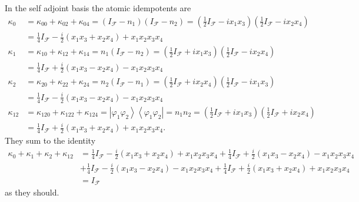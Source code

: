 \documentclass[aps,preprint]{revtex4}%
\begin{document}
In the self adjoint basis the atomic idempotents are%
\begin{align}
\kappa_{0}  & =\kappa_{00}+\kappa_{02}+\kappa_{04}=\left(  I_{\mathcal{F}%
}-n_{1}\right)  \left(  I_{\mathcal{F}}-n_{2}\right)  =\left(  \frac{1}%
{2}I_{\mathcal{F}}-ix_{1}x_{3}\right)  \left(  \frac{1}{2}I_{\mathcal{F}%
}-ix_{2}x_{4}\right)  \\
& =\frac{1}{4}I_{\mathcal{F}}-\frac{i}{2}\left(  x_{1}x_{3}+x_{2}x_{4}\right)
+x_{1}x_{2}x_{3}x_{4}\\
\kappa_{1}  & =\kappa_{10}+\kappa_{12}+\kappa_{14}=n_{1}\left(  I_{\mathcal{F}%
}-n_{2}\right)  =\left(  \frac{1}{2}I_{\mathcal{F}}+ix_{1}x_{3}\right)
\left(  \frac{1}{2}I_{\mathcal{F}}-ix_{2}x_{4}\right)  \\
& =\frac{1}{4}I_{\mathcal{F}}+\frac{i}{2}\left(  x_{1}x_{3}-x_{2}x_{4}\right)
-x_{1}x_{2}x_{3}x_{4}\\
\kappa_{2}  & =\kappa_{20}+\kappa_{22}+\kappa_{24}=n_{2}\left(  I_{\mathcal{F}%
}-n_{1}\right)  =\left(  \frac{1}{2}I_{\mathcal{F}}+ix_{2}x_{4}\right)
\left(  \frac{1}{2}I_{\mathcal{F}}-ix_{1}x_{3}\right)  \\
& =\frac{1}{4}I_{\mathcal{F}}-\frac{i}{2}\left(  x_{1}x_{3}-x_{2}x_{4}\right)
-x_{1}x_{2}x_{3}x_{4}\\
\kappa_{12}  & =\kappa_{120}+\kappa_{122}+\kappa_{124}=\left\vert \varphi
_{1}\varphi_{2}\right\rangle \left\langle \varphi_{1}\varphi_{2}\right\vert
=n_{1}n_{2}=\left(  \frac{1}{2}I_{\mathcal{F}}+ix_{1}x_{3}\right)  \left(
\frac{1}{2}I_{\mathcal{F}}+ix_{2}x_{4}\right)  \\
& =\frac{1}{4}I_{\mathcal{F}}+\frac{i}{2}\left(  x_{1}x_{3}+x_{2}x_{4}\right)
+x_{1}x_{2}x_{3}x_{4}.
\end{align}
They sum to the identity%
\begin{align}
\kappa_{0}+\kappa_{1}+\kappa_{2}+\kappa_{12} &  =\frac{1}{4}I_{\mathcal{F}%
}-\frac{i}{2}\left(  x_{1}x_{3}+x_{2}x_{4}\right)  +x_{1}x_{2}x_{3}x_{4}%
+\frac{1}{4}I_{\mathcal{F}}+\frac{i}{2}\left(  x_{1}x_{3}-x_{2}x_{4}\right)
-x_{1}x_{2}x_{3}x_{4}\\
&  +\frac{1}{4}I_{\mathcal{F}}-\frac{i}{2}\left(  x_{1}x_{3}-x_{2}%
x_{4}\right)  -x_{1}x_{2}x_{3}x_{4}+\frac{1}{4}I_{\mathcal{F}}+\frac{i}%
{2}\left(  x_{1}x_{3}+x_{2}x_{4}\right)  +x_{1}x_{2}x_{3}x_{4}\\
&  =I_{\mathcal{F}}%
\end{align}
as they should. 
\end{document}
